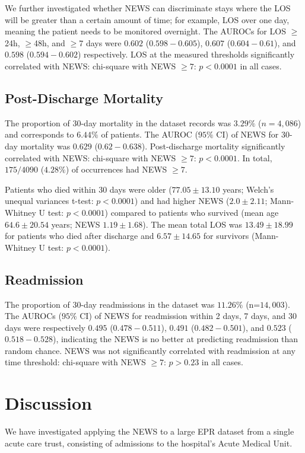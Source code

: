 \documentclass[10pt,journal, compsoc]{IEEEtran}
\begin{document}
We further investigated whether NEWS can discriminate stays where the LOS will be greater than a certain amount of time; for example, LOS over one day, meaning the patient needs to be monitored overnight. The AUROCs for LOS $\geq$24h, $\geq$48h, and $\geq$7 days were $0.602$ ($0.598-0.605$), $0.607$ ($0.604-0.61$), and $0.598$ ($0.594-0.602$) respectively. LOS at the measured thresholds significantly correlated with NEWS: chi-square with NEWS $\geq 7$: $p < 0.0001$ in all cases.

\subsection{Post-Discharge Mortality}
The proportion of 30-day mortality in the dataset records was $3.29\%$ ($n=4,086$) and corresponds to $6.44\%$ of patients. The AUROC ($95\%$ CI) of NEWS for 30-day mortality was $0.629$ ($0.62-0.638$). Post-discharge mortality significantly correlated with NEWS: chi-square with NEWS $\geq 7$: $p < 0.0001$. In total, $175/4090$ ($4.28\%$) of occurrences had NEWS $\geq 7$.

Patients who died within 30 days were older ($77.05 \pm 13.10$ years; Welch's unequal variances t-test: $p < 0.0001$) and had higher NEWS ($2.0 \pm 2.11$; Mann-Whitney U test: $p < 0.0001$) compared to patients who survived (mean age $64.6 \pm 20.54$ years; NEWS $1.19 \pm 1.68$). The mean total LOS was $13.49 \pm 18.99$ for patients who died after discharge and $6.57 \pm 14.65$ for survivors (Mann-Whitney U test: $p < 0.0001$).

\subsection{Readmission} The proportion of 30-day readmissions in the dataset was $11.26\%$ (n=$14,003$). The AUROCs ($95\%$ CI) of NEWS for readmission within 2 days, 7 days, and 30 days were respectively $0.495$ ($0.478-0.511$), $0.491$ ($0.482-0.501$), and $0.523$ ($0.518-0.528$), indicating the NEWS is no better at predicting readmission than random chance. NEWS was not significantly correlated with readmission at any time threshold: chi-square with NEWS $\geq 7$: $p > 0.23$ in all cases.

\section{Discussion}
We have investigated applying the NEWS to a large EPR dataset from a single acute care trust, consisting of admissions to the hospital's Acute Medical Unit.
\end{document}
